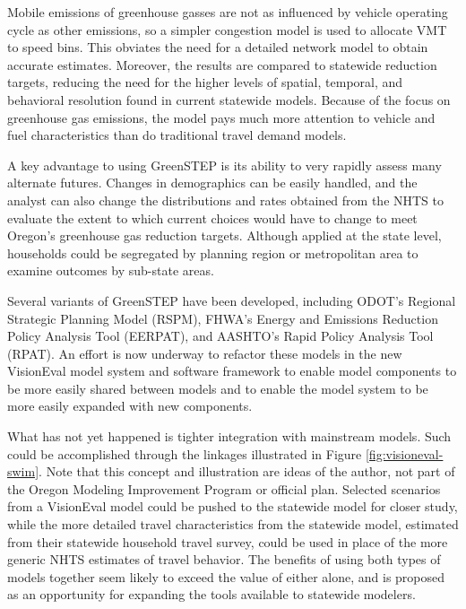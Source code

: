 Mobile emissions of greenhouse gasses are not as influenced by vehicle operating cycle as other emissions, so a simpler congestion model is used to allocate VMT to speed bins. This obviates the need for a detailed network model to obtain accurate estimates. Moreover, the results are compared to statewide reduction targets, reducing the need for the higher levels of spatial, temporal, and behavioral resolution found in current statewide models. Because of the focus on greenhouse gas emissions, the model pays much more attention to vehicle and fuel characteristics than do traditional travel demand models.

A key advantage to using GreenSTEP is its ability to very rapidly assess many alternate futures. Changes in demographics can be easily handled, and the analyst can also change the distributions and rates obtained from the NHTS to evaluate the extent to which current choices would have to change to meet Oregon's greenhouse gas reduction targets. Although applied at the state level, households could be segregated by planning region or metropolitan area to examine outcomes by sub-state areas.

Several variants of GreenSTEP have been developed, including ODOT's Regional Strategic Planning Model (RSPM), FHWA's Energy and Emissions Reduction Policy Analysis Tool (EER\-PAT), and AASHTO's Rapid Policy Analysis Tool (RPAT). An effort is now underway to refactor these models in the new VisionEval model system and software framework to enable model components to be more easily shared between models and to enable the model system to be more easily expanded with new components.

What has not yet happened is tighter integration with mainstream models. Such could be accomplished through the linkages illustrated in Figure \ref{fig:visioneval-swim}. Note that this concept and illustration are ideas of the author, not part of the Oregon Modeling Improvement Program or official plan. Selected scenarios from a VisionEval model could be pushed to the statewide model for closer study, while the more detailed travel characteristics from the statewide model, estimated from their statewide household travel survey, could be used in place of the more generic NHTS estimates of travel behavior. The benefits of using both types of models together seem likely to exceed the value of either alone, and is proposed as an opportunity for expanding the tools available to statewide modelers.

